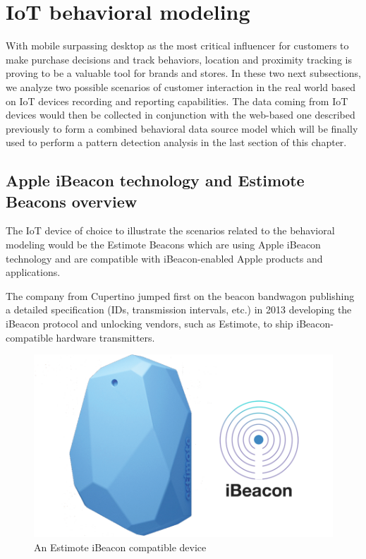 \newpage
\section{IoT behavioral modeling}

With mobile surpassing desktop as the most critical influencer for customers to make purchase decisions and track behaviors, location and proximity tracking is proving to be a valuable tool for brands and stores.  In these two next subsections, we analyze two possible scenarios of customer interaction in the real world based on IoT devices recording and reporting capabilities. The data coming from IoT devices would then be collected in conjunction with the web-based one described previously to form a combined behavioral data source model which will be finally used to perform a pattern detection analysis in the last section of this chapter.

\subsection{Apple iBeacon technology and Estimote Beacons overview}

The IoT device of choice to illustrate the scenarios related to the behavioral modeling would be the Estimote Beacons which are using Apple iBeacon technology and are compatible with iBeacon-enabled Apple products and applications.

The company from Cupertino jumped first on the beacon bandwagon publishing a detailed specification (IDs, transmission intervals, etc.) in 2013 developing the iBeacon protocol and unlocking vendors, such as Estimote, to ship iBeacon-compatible hardware transmitters.

\vspace{0.5cm}
\begin{figure}[H]
  \centering
    \includegraphics[width=16cm]{images/ibeacon.png}
  \caption{An Estimote iBeacon compatible device}
  \label{fig:estimote-beacon}
\end{figure}
\vspace{0.5cm}


